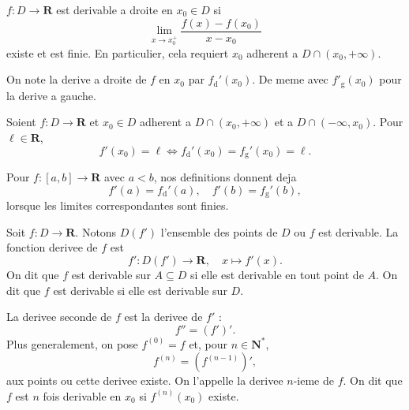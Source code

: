 \begin{definition}
$f:D\to \mathbf{R}$ est derivable a droite en $x_{0}\in D$ si
$$
\lim_{ x \to x_{0}^{+} } \frac{f(x)-f(x_{0})}{x-x_{0}}
$$
existe et est finie. En particulier, cela requiert $x_{0}$ adherent a $D\cap(x_{0},+\infty)$.
\end{definition}
\begin{notation}
On note la derive a droite de $f$ en $x_{0}$ par $f_{\mathrm{d}}'(x_{0})$. De meme avec $f'_{\mathrm{g}}(x_{0})$ pour la derive a gauche.
\end{notation}
\begin{proposition}
Soient $f:D\to \mathbf{R}$ et $x_{0}\in D$ adherent a $D\cap(x_{0},+\infty)$ et a $D\cap(-\infty,x_{0})$. Pour $\ell \in \mathbf{R}$, 
$$
f'(x_{0})=\ell \Leftrightarrow f_{\mathrm{d}}'(x_{0})=f_{\mathrm{g}}'(x_{0})=\ell.
$$
\end{proposition}
\begin{reminder}
Pour $f:[a,b]\to \mathbf{R}$ avec $a<b$, nos definitions donnent deja
$$
f'(a)=f_{\mathrm{d}}'(a),\quad f'(b)=f_{\mathrm{g}}'(b),
$$
lorsque les limites correspondantes sont finies.
\end{reminder}

\begin{definition}
Soit $f:D\to \mathbf{R}$. Notons $D(f')$ l'ensemble des points de $D$ ou $f$ est derivable. La fonction derivee de $f$ est
$$
f':D(f')\to \mathbf{R},\quad x\mapsto f'(x).
$$
On dit que $f$ est derivable sur $A\subseteq D$ si elle est derivable en tout point de $A$. On dit que $f$ est derivable si elle est derivable sur $D$.
\end{definition}
\begin{definition}
La derivee seconde de $f$ est la derivee de $f'$ :
$$
f''=(f')'.
$$
Plus generalement, on pose $f^{(0)}=f$ et, pour $n\in \mathbf{N}^{*}$, 
$$
f^{(n)}=(f^{(n-1)})',
$$
aux points ou cette derivee existe. On l'appelle la derivee $n$-ieme de $f$. On dit que $f$ est $n$ fois derivable en $x_{0}$ si $f^{(n)}(x_{0})$ existe.
\end{definition}